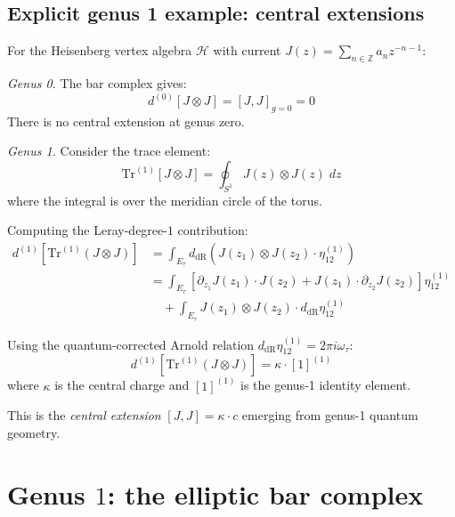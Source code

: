 \subsection{Explicit genus 1 example: central extensions}

\begin{example}
\label{ex:heisenberg-genus-1}
For the Heisenberg vertex algebra $\mathcal{H}$ with current $J(z) = \sum_{n \in \mathbb{Z}} a_n z^{-n-1}$:

\emph{Genus 0.} The bar complex gives:
\begin{equation}
d^{(0)}[J \otimes J] = [J, J]_{g=0} = 0
\end{equation}
There is no central extension at genus zero.

\emph{Genus 1.} Consider the trace element:
\begin{equation}
\text{Tr}^{(1)}[J \otimes J] = \oint_{S^1} J(z) \otimes J(z) \; dz
\end{equation}
where the integral is over the meridian circle of the torus.

Computing the Leray-degree-$1$ contribution:
\begin{align}
d^{(1)}[\text{Tr}^{(1)}(J \otimes J)] &= \int_{E_\tau} d_{\mathrm{dR}}\!\left(J(z_1) \otimes J(z_2) \cdot \eta_{12}^{(1)}\right)\\
&= \int_{E_\tau} \left[\partial_{z_1} J(z_1) \cdot J(z_2) + J(z_1) \cdot \partial_{z_2} J(z_2)\right] \eta_{12}^{(1)}\\
&\quad + \int_{E_\tau} J(z_1) \otimes J(z_2) \cdot d_{\mathrm{dR}}\eta_{12}^{(1)}
\end{align}

Using the quantum-corrected Arnold relation
$d_{\mathrm{dR}}\eta_{12}^{(1)} = 2\pi i \omega_\tau$:
\begin{equation}
d^{(1)}[\text{Tr}^{(1)}(J \otimes J)] = \kappa \cdot [1]^{(1)}
\end{equation}
where $\kappa$ is the central charge and $[1]^{(1)}$ is the genus-1 identity element.

This is the \emph{central extension} $[J, J] = \kappa \cdot c$ emerging from genus-1 quantum geometry.
\end{example}


\section{\texorpdfstring{Genus $1$: the elliptic bar complex}{Genus 1: the elliptic bar complex}}
\label{sec:genus-1-elliptic-complete}

